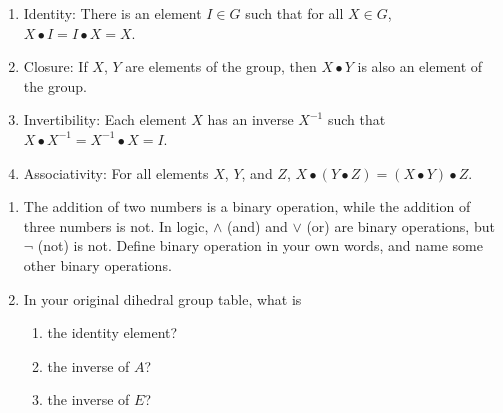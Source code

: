 \documentclass[../gatm.tex]{subfiles}
\begin{document}
\begin{enumerate}[label=(\alph*)]
\item Identity: There is an element $I\in G$ such that for all $X\in G$, $X\bullet I = I\bullet X = X$.
\item Closure: If $X$, $Y$ are elements of the group, then $X\bullet Y$ is also an element of the group.
\item Invertibility: Each element $X$ has an inverse $X^{-1}$ such that $X\bullet X^{-1} = X^{-1}\bullet X = I$.
\item Associativity: For all elements $X$, $Y$, and $Z$, $X\bullet (Y\bullet Z) = (X\bullet Y) \bullet Z$.
\end{enumerate}
\begin{enumerate}
\setcounter{enumi}{\theenumLast}
\item The addition of two numbers is a binary operation, while the addition of three numbers is not. In logic, $\land$ (and) and $\lor$ (or) are binary operations, but $\lnot$ (not) is not. Define binary operation in your own words, and name some other binary operations.
\item In your original dihedral group table, what is
\begin{multicols}{3}
\begin{enumerate}
\item the identity element?
\item the inverse of $A$?
\item the inverse of $E$?
\end{enumerate}
\end{multicols}
\end{enumerate}
\end{document}
